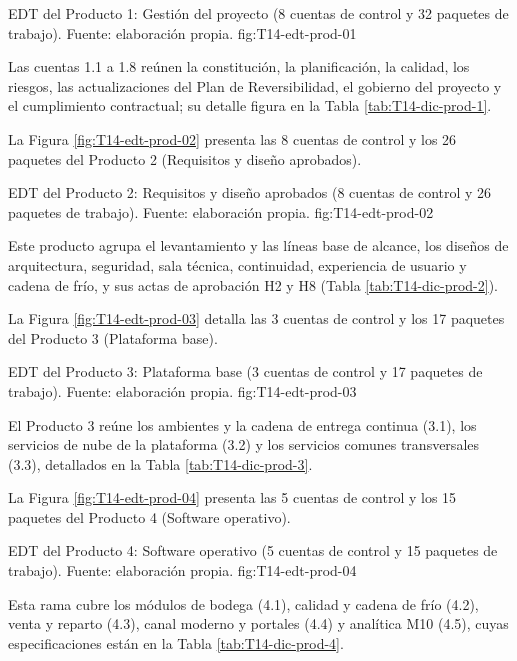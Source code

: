   {EDT del Producto 1: Gestión del proyecto (8 cuentas de control y 32 paquetes de trabajo). Fuente: elaboración propia.}
  {fig:T14-edt-prod-01}

Las cuentas 1.1 a 1.8 reúnen la constitución, la planificación, la calidad, los riesgos, las actualizaciones del Plan de Reversibilidad, el gobierno del proyecto y el cumplimiento contractual; su detalle figura en la Tabla \ref{tab:T14-dic-prod-1}.

La Figura \ref{fig:T14-edt-prod-02} presenta las 8 cuentas de control y los 26 paquetes del Producto 2 (Requisitos y diseño aprobados).

  {EDT del Producto 2: Requisitos y diseño aprobados (8 cuentas de control y 26 paquetes de trabajo). Fuente: elaboración propia.}
  {fig:T14-edt-prod-02}

Este producto agrupa el levantamiento y las líneas base de alcance, los diseños de arquitectura, seguridad, sala técnica, continuidad, experiencia de usuario y cadena de frío, y sus actas de aprobación H2 y H8 (Tabla \ref{tab:T14-dic-prod-2}).

La Figura \ref{fig:T14-edt-prod-03} detalla las 3 cuentas de control y los 17 paquetes del Producto 3 (Plataforma base).

  {EDT del Producto 3: Plataforma base (3 cuentas de control y 17 paquetes de trabajo). Fuente: elaboración propia.}
  {fig:T14-edt-prod-03}

El Producto 3 reúne los ambientes y la cadena de entrega continua (3.1), los servicios de nube de la plataforma (3.2) y los servicios comunes transversales (3.3), detallados en la Tabla \ref{tab:T14-dic-prod-3}.

La Figura \ref{fig:T14-edt-prod-04} presenta las 5 cuentas de control y los 15 paquetes del Producto 4 (Software operativo).

  {EDT del Producto 4: Software operativo (5 cuentas de control y 15 paquetes de trabajo). Fuente: elaboración propia.}
  {fig:T14-edt-prod-04}

Esta rama cubre los módulos de bodega (4.1), calidad y cadena de frío (4.2), venta y reparto (4.3), canal moderno y portales (4.4) y analítica M10 (4.5), cuyas especificaciones están en la Tabla \ref{tab:T14-dic-prod-4}.

